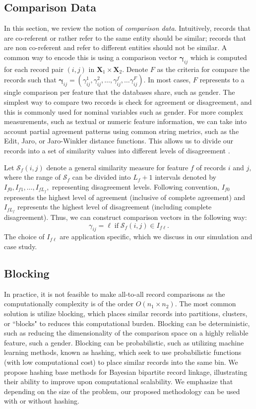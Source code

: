 \documentclass[12pt,letterpaper]{article}
\newcommand{\1}[1]{\mathbb{I}\!\left[#1\right]} %
\begin{document}
\subsection{Comparison Data}
In this section, we review the notion of \emph{comparison data}. Intuitively, records that are co-referent or rather refer to the same entity should be similar; records that are non co-referent and refer to different entities should not be similar. A common way to encode this is using a comparison vector $\bm{\gamma}_{ij}$ which is computed for each record pair $(i,j)$ in $\bm{X}_1 \times \bm{X}_2.$ Denote $F$ as the criteria for compare the records such that 
$\bm{\gamma}_{ij} = (\gamma_{ij}^1, \gamma_{ij}^2, \ldots, \gamma_{ij}^f, \ldots \gamma_{ij}^F).$ In most cases, $F$ represents to a single comparison per feature that the databases share, such as gender. 
%
The simplest way to compare two records is check for agreement or disagreement, and this is commonly used for nominal variables such as gender. For more complex measurements, such as textual or numeric feature information, we can take into account partial agreement patterns using common string metrics, such as the Edit, Jaro, or Jaro-Winkler distance functions. This allows us to divide our records into a set of similarity values into different levels of disagreement \citep{bilenko2006riddle, elmagarmid_duplicate_2007}. 

Let $\mathcal{S}_f(i,j)$ denote a general similarity measure for feature $f$ of records $i$ and $j,$ where the range of $\mathcal{S}_f$ can be divided into $L_f +1$ intervals denoted by $I_{f0}, I_{f1}, \ldots, I_{fL_f},$ representing disagreement levels. Following convention, $I_{f0}$ represents the highest level of agreement (inclusive of complete agreement) and $I_{fL_f}$ represents the highest level of disagreement (including complete disagreement). Thus, we can construct comparison vectors in the following way: 
$$\gamma_{ij} = \ell \; \text{if} \; \mathcal{S}_f(i,j) \in I_{f\ell}.$$ The choice of $I_{f\ell}$ are application specific, which we discuss in our simulation and case study. 

\subsection{Blocking}
In practice, it is not feasible to make all-to-all record comparisons as the computationally complexity is of the order $O(n_1 \times n_2).$ The most common solution is utilize blocking, which places similar records into partitions, clusters, or ``blocks" to reduces this computational burden. Blocking can be deterministic, such as reducing the dimensionality of the comparison space on a highly reliable feature, such a gender. Blocking can be probabilistic, such as utilizing machine learning methods, known as hashing, which seek to use probabilistic functions (with low computational cost) to place similar records into the same bin. We propose hashing base methods for Bayesian bipartite record linkage, illustrating their ability to improve upon computational scalability. We emphasize that depending on the size of the problem, our proposed methodology can be used with or without hashing.
\end{document}
